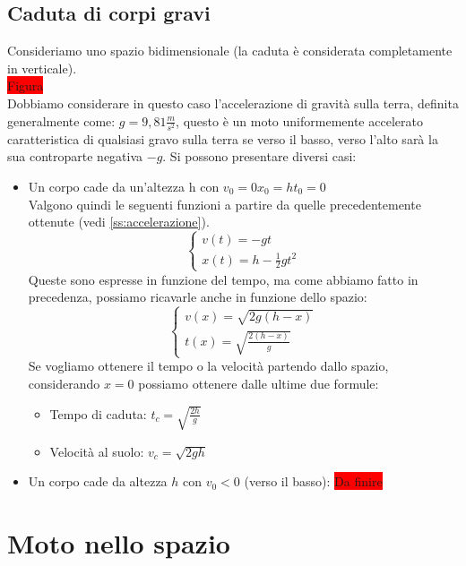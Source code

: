 \documentclass[a4paper,12pt]{report}
\begin{document}
	\subsection{Caduta di corpi gravi}
	Consideriamo uno spazio bidimensionale (la caduta è considerata completamente in verticale).\\
	\colorbox{red}{Figura}\\
	Dobbiamo considerare in questo caso l'accelerazione di gravità sulla terra, definita generalmente come: $g = 9,81\frac{m}{s^2}$, questo è un moto uniformemente accelerato caratteristica di qualsiasi gravo sulla terra se verso il basso, verso l'alto sarà la sua controparte negativa $-g$. Si possono presentare diversi casi:
	\begin{itemize}
		\item Un corpo cade da un'altezza h con $v_0 = 0$\;\;\;$x_0 = h$\;\;\;$t_0 = 0$\\Valgono quindi le seguenti funzioni a partire da quelle precedentemente ottenute (vedi \ref{ss:accelerazione}).
		\begin{equation}
			\begin{cases}
				v(t) = -gt	\\
				x(t) = h - \frac{1}{2}gt^2
			\end{cases}
		\end{equation}
		Queste sono espresse in funzione del tempo, ma come abbiamo fatto in precedenza, possiamo ricavarle anche in funzione dello spazio:
		\begin{equation}
			\begin{cases}
				v(x) = \sqrt{2g(h-x)}	\\
				t(x) = \sqrt{\frac{2(h-x)}{g}}
			\end{cases}
		\end{equation}
		Se vogliamo ottenere il tempo o la velocità partendo dallo spazio, considerando $x = 0$ possiamo ottenere dalle ultime due formule:
		\begin{itemize}
			\item Tempo di caduta: $t_c = \sqrt{\frac{2h}{g}}$
			\item Velocità al suolo: $v_c = \sqrt{2gh}$
		\end{itemize}
		\item Un corpo cade da altezza $h$ con $v_0 < 0$ (verso il basso):
		\colorbox{red}{Da finire}
	\end{itemize}
	
	\section{Moto nello spazio}
	
\end{document}
